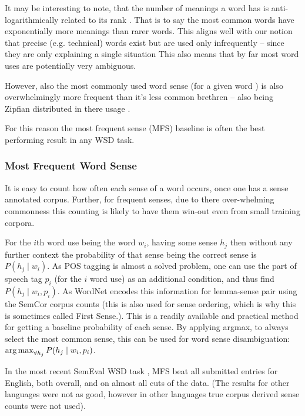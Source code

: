 \documentclass[12pt,parskip]{komatufte}
\begin{document}
It may be interesting to note, that the number of meanings a word has is anti-logarithmically related to its rank .
That is to say the most common words have exponentially more meanings than rarer words.
This aligns well with our notion that precise (e.g. technical) words exist but are used only infrequently -- since they are only explaining a single situation
This also means that by far most word uses are potentially very ambiguous.

However, also the most commonly used word sense (for a given word ) is also overwhelmingly more frequent than it's less common brethren -- also being Zipfian distributed in there usage \cite{Kilgarriff2004}.

For this reason the most frequent sense (MFS) baseline is often the best performing result in any WSD task.

\subsubsection{Most Frequent Word Sense}
It is easy to count how often each sense of a word occurs,
once one has a sense annotated corpus.
Further, for frequent senses, due to there over-whelming commonness this counting is likely to have them win-out even from small training corpora.

For the $i$th word use being the word $w_i$, having some sense $h_j$
then without any further context the 
probability of that sense being the correct sense is $P(h_j \mid w_i)$.
As POS tagging is almost a solved problem, one can use the part of speech tag $p_i$ (for the $i$ word use) as an additional condition, and thus find $P(h_j \mid w_i, p_i)$.
As WordNet encodes this information for lemma-sense pair using the SemCor corpus counts (this is also used for sense ordering, which is why this is sometimes called First Sense.).
This is a readily available and practical method for getting a baseline probability of each sense.
By applying argmax, to always select the most common sense, this can be used for word sense disambiguation:  $\operatorname*{arg\,max}_{\forall h_j} P(h_j \mid w_i, p_i)$.

In the most recent SemEval WSD task ,
MFS beat all submitted entries for English, both overall, and on almost all cuts of the data.
(The results for other languages were not as good, however in other languages true corpus derived sense counts were not used).
\end{document}
